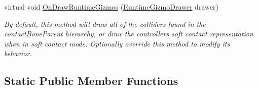\begin{DoxyCompactItemize}
virtual void \mbox{\hyperlink{class_leap_1_1_unity_1_1_interaction_1_1_interaction_controller_aea16165952781a04b0da774cca6561a1}{On\+Draw\+Runtime\+Gizmos}} (\mbox{\hyperlink{class_leap_1_1_unity_1_1_runtime_gizmos_1_1_runtime_gizmo_drawer}{Runtime\+Gizmo\+Drawer}} drawer)
\begin{DoxyCompactList}\small\item\em By default, this method will draw all of the colliders found in the contact\+Bone\+Parent hierarchy, or draw the controller\textquotesingle{}s soft contact representation when in soft contact mode. Optionally override this method to modify its behavior. \end{DoxyCompactList}\end{DoxyCompactItemize}
\subsection*{Static Public Member Functions}
